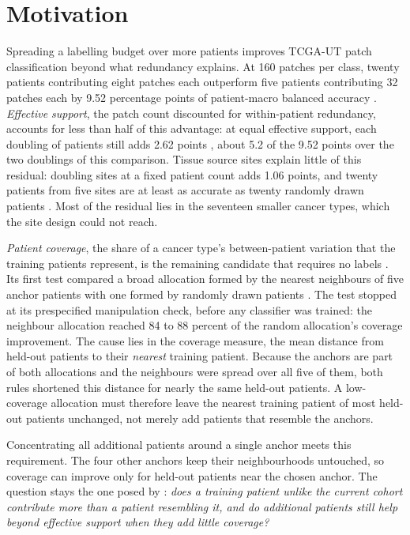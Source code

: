 \documentclass[11pt]{article}
\begin{document}
\begin{abstract}
fixed patient count to distinguish concentration damage from improvement over ordinary sampling.
\end{abstract}
\setcounter{tocdepth}{1}
\tableofcontents
\clearpage

\section{Motivation}
\label{sec:motivation}
Spreading a labelling budget over more patients improves TCGA-UT patch classification beyond what redundancy explains. At 160 patches per class, twenty patients contributing eight patches each outperform five patients contributing 32 patches each by 9.52 percentage points of patient-macro balanced accuracy \citep{queisler2026effectiveSupport}. \emph{Effective support}, the patch count discounted for within-patient redundancy, accounts for less than half of this advantage: at equal effective support, each doubling of patients still adds 2.62 points \citep{queisler2026multidirectionalRedundancy}, about 5.2 of the 9.52 points over the two doublings of this comparison. Tissue source sites explain little of this residual: doubling sites at a fixed patient count adds 1.06 points, and twenty patients from five sites are at least as accurate as twenty randomly drawn patients \citep{queisler2026siteCoverage}. Most of the residual lies in the seventeen smaller cancer types, which the site design could not reach.

\emph{Patient coverage}, the share of a cancer type's between-patient variation that the training patients represent, is the remaining candidate that requires no labels \citep{komura2022universalEncoding}. Its first test compared a broad allocation formed by the nearest neighbours of five anchor patients with one formed by randomly drawn patients \citep{queisler2026patientCoverage}. The test stopped at its prespecified manipulation check, before any classifier was trained: the neighbour allocation reached 84 to 88 percent of the random allocation's coverage improvement. The cause lies in the coverage measure, the mean distance from held-out patients to their \emph{nearest} training patient. Because the anchors are part of both allocations and the neighbours were spread over all five of them, both rules shortened this distance for nearly the same held-out patients. A low-coverage allocation must therefore leave the nearest training patient of most held-out patients unchanged, not merely add patients that resemble the anchors.

Concentrating all additional patients around a single anchor meets this requirement. The four other anchors keep their neighbourhoods untouched, so coverage can improve only for held-out patients near the chosen anchor. The question stays the one posed by \citet{queisler2026patientCoverage}: \emph{does a training patient unlike the current cohort contribute more than a patient resembling it, and do additional patients still help beyond effective support when they add little coverage?}
\end{document}
